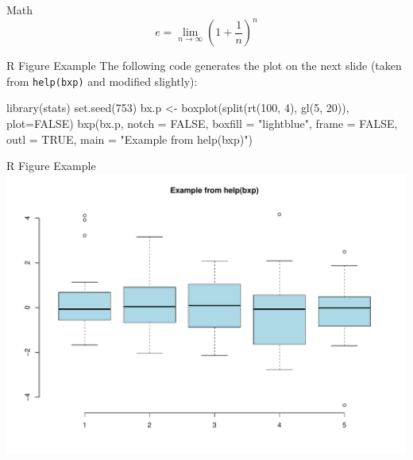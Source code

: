 \documentclass[12pt,ignorenonframetext,]{beamer}
\newenvironment{Shaded}{\begin{snugshade}}{\end{snugshade}}
\newcommand{\AttributeTok}[1]{\textcolor[rgb]{0.77,0.63,0.00}{#1}}
\newcommand{\ConstantTok}[1]{\textcolor[rgb]{0.00,0.00,0.00}{#1}}
\newcommand{\DecValTok}[1]{\textcolor[rgb]{0.00,0.00,0.81}{#1}}
\newcommand{\FunctionTok}[1]{\textcolor[rgb]{0.00,0.00,0.00}{#1}}
\newcommand{\NormalTok}[1]{#1}
\newcommand{\OtherTok}[1]{\textcolor[rgb]{0.56,0.35,0.01}{#1}}
\newcommand{\StringTok}[1]{\textcolor[rgb]{0.31,0.60,0.02}{#1}}
\begin{document}
\begin{frame}{Math}
\protect\hypertarget{math}{}
\begin{equation*}
    e = \lim_{n\to \infty} \left(1 + \frac{1}{n}\right)^n
\end{equation*}
\end{frame}

\begin{frame}[fragile]{R Figure Example}
\protect\hypertarget{r-figure-example}{}
The following code generates the plot on the next slide (taken from
\texttt{help(bxp)} and modified slightly):

\begin{Shaded}
\begin{Highlighting}[]
\FunctionTok{library}\NormalTok{(stats)}
\FunctionTok{set.seed}\NormalTok{(}\DecValTok{753}\NormalTok{)}
\NormalTok{bx.p }\OtherTok{\textless{}{-}} \FunctionTok{boxplot}\NormalTok{(}\FunctionTok{split}\NormalTok{(}\FunctionTok{rt}\NormalTok{(}\DecValTok{100}\NormalTok{, }\DecValTok{4}\NormalTok{),}
                      \FunctionTok{gl}\NormalTok{(}\DecValTok{5}\NormalTok{, }\DecValTok{20}\NormalTok{)), }\AttributeTok{plot=}\ConstantTok{FALSE}\NormalTok{)}
\FunctionTok{bxp}\NormalTok{(bx.p, }\AttributeTok{notch =} \ConstantTok{FALSE}\NormalTok{, }\AttributeTok{boxfill =} \StringTok{"lightblue"}\NormalTok{,}
    \AttributeTok{frame =} \ConstantTok{FALSE}\NormalTok{, }\AttributeTok{outl =} \ConstantTok{TRUE}\NormalTok{,}
    \AttributeTok{main =} \StringTok{"Example from help(bxp)"}\NormalTok{)}
\end{Highlighting}
\end{Shaded}
\end{frame}

\begin{frame}{R Figure Example}
\protect\hypertarget{r-figure-example-1}{}
\includegraphics{myslides_files/figure-beamer/pressureFig-1.pdf}
\end{frame}
\end{document}
